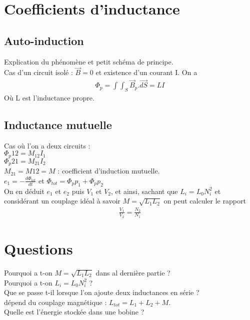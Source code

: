 \documentclass[12pt,prb,aps,epsf]{article}
\begin{document}
\section{Coefficients d'inductance}
\subsection{Auto-induction}

Explication du phénomène et petit schéma de principe.\\
Cas d'un circuit isolé : $\vec{B} = 0$ et existence d'un courant I. On a 
\begin{eqnarray}
\Phi_p = \int\int_{S} \vec{B}_p.\vec{dS} = LI
\end{eqnarray}
Où L est l'inductance propre.
\subsection{Inductance mutuelle}
Cas où l'on a deux circuits :\\
$\Phi_p{12} = M_{12}I_1$\\
$\Phi_p{21} = M_{21}I_2$\\
$M_{21} = M{12} = M$ : coefficient d'induction mutuelle.\\
$e_1 = -\frac{d\Phi_{tot}}{dt}$ et $\Phi_{tot} = \Phi_p{p_1} + \Phi_p{p_2}$\\
On en déduit $e_1$ et $e_2$ puis $V_1$ et $V_2$, et ainsi, sachant que $L_i=L_0N_i^2$ et considérant un couplage idéal à savoir $M=\sqrt{L_1L_2}$ on peut calculer le rapport 
\begin{eqnarray}
\frac{V_1}{V_2} = \frac{N_2}{N_1}
\end{eqnarray}

\section*{Questions}

Pourquoi a t-on $M=\sqrt{L_1L_2}$ dans al dernière partie ?\\

Pourquoi a t-on $L_i=L_0N_i^2$ ?\\

Que se passe t-il lorsque l'on ajoute deux inductances en série ?\\
dépend du couplage magnétique : $L_{tot} = L_1 + L_2 + M$.\\

Quelle est l'énergie stockée dans une bobine ?\\
\end{document}
